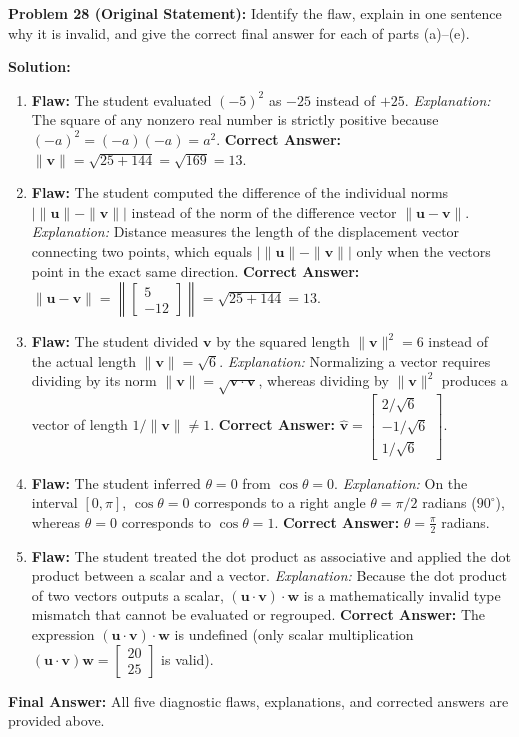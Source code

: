 \documentclass[11pt, letterpaper]{article}
\theoremstyle{definition}
\theoremstyle{remark}
\begin{document}
\medskip
\textbf{Problem 28 (Original Statement):} Identify the flaw, explain in one sentence why it is invalid, and give the correct final answer for each of parts (a)--(e).

\textbf{Solution:}
\begin{enumerate}[label=(\alph*)]
    \item \textbf{Flaw:} The student evaluated $(-5)^2$ as $-25$ instead of $+25$. \textit{Explanation:} The square of any nonzero real number is strictly positive because $(-a)^2 = (-a)(-a) = a^2$. \textbf{Correct Answer:} $\|\mathbf{v}\| = \sqrt{25 + 144} = \sqrt{169} = 13$.
    \item \textbf{Flaw:} The student computed the difference of the individual norms $|\|\mathbf{u}\| - \|\mathbf{v}\||$ instead of the norm of the difference vector $\|\mathbf{u} - \mathbf{v}\|$. \textit{Explanation:} Distance measures the length of the displacement vector connecting two points, which equals $|\|\mathbf{u}\| - \|\mathbf{v}\||$ only when the vectors point in the exact same direction. \textbf{Correct Answer:} $\|\mathbf{u} - \mathbf{v}\| = \left\|\begin{bmatrix} 5 \\ -12 \end{bmatrix}\right\| = \sqrt{25 + 144} = 13$.
    \item \textbf{Flaw:} The student divided $\mathbf{v}$ by the squared length $\|\mathbf{v}\|^2 = 6$ instead of the actual length $\|\mathbf{v}\| = \sqrt{6}$. \textit{Explanation:} Normalizing a vector requires dividing by its norm $\|\mathbf{v}\| = \sqrt{\mathbf{v} \cdot \mathbf{v}}$, whereas dividing by $\|\mathbf{v}\|^2$ produces a vector of length $1/\|\mathbf{v}\| \neq 1$. \textbf{Correct Answer:} $\hat{\mathbf{v}} = \begin{bmatrix} 2/\sqrt{6} \\ -1/\sqrt{6} \\ 1/\sqrt{6} \end{bmatrix}$.
    \item \textbf{Flaw:} The student inferred $\theta = 0$ from $\cos\theta = 0$. \textit{Explanation:} On the interval $[0, \pi]$, $\cos\theta = 0$ corresponds to a right angle $\theta = \pi/2$ radians ($90^\circ$), whereas $\theta = 0$ corresponds to $\cos\theta = 1$. \textbf{Correct Answer:} $\theta = \frac{\pi}{2}$ radians.
    \item \textbf{Flaw:} The student treated the dot product as associative and applied the dot product between a scalar and a vector. \textit{Explanation:} Because the dot product of two vectors outputs a scalar, $(\mathbf{u} \cdot \mathbf{v}) \cdot \mathbf{w}$ is a mathematically invalid type mismatch that cannot be evaluated or regrouped. \textbf{Correct Answer:} The expression $(\mathbf{u} \cdot \mathbf{v}) \cdot \mathbf{w}$ is undefined (only scalar multiplication $(\mathbf{u} \cdot \mathbf{v})\mathbf{w} = \begin{bmatrix} 20 \\ 25 \end{bmatrix}$ is valid).
\end{enumerate}
\textbf{Final Answer:} All five diagnostic flaws, explanations, and corrected answers are provided above.
\end{document}
